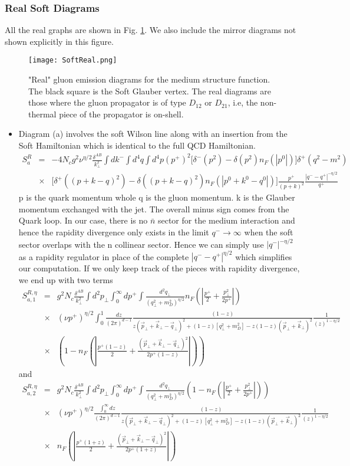 \documentclass[letter,11pt]{article}
\newcommand{\nn}{\nonumber}
\newcommand{\bea}{\begin{eqnarray}}
\newcommand{\eea}{\end{eqnarray}}
\def\nn{\nonumber}
\begin{document}
\subsubsection{Real Soft Diagrams}
 All the real graphs are shown in Fig. \ref{SoftR}. We also include the mirror diagrams not shown explicitly in this figure.
\begin{figure}
  \texttt{[image: SoftReal.png]}
  \caption{"Real" gluon emission diagrams for the medium structure function. The black square is the Soft Glauber vertex. The real diagrams are those where the gluon propagator is of type $D_{12}$ or $D_{21}$, i.e, the non-thermal piece of the propagator is on-shell. }
  \label{SoftR}
\end{figure}
\begin{itemize}
\item Diagram (a) involves the soft Wilson line along with an insertion from the Soft Hamiltonian which is identical to the full QCD Hamiltonian.
\bea
S_a^R&= & -4N_cg^2\nu^{\eta/2}\frac{\delta^{AB}}{k_{\perp}^2}\int dk^-\int d^4q\int d^4p(p^+)^2\Big[\delta^-(p^2)-\delta(p^2)n_F(|p^0|)\Big]\delta^+(q^2-m^2)\nn\\
&\times&\Big[\delta^+((p+k-q)^2)-\delta((p+k-q)^2)n_F(|p^0+k^0-q^0|)\Big]\frac{p^+}{(p+k)^2}\frac{|q^--q^+|^{-\eta/2}}{q^+}\nn
\eea
p is the quark momentum whole q is the gluon momentum. k is the Glauber momentum exchanged with the jet. The overall minus sign comes from the Quark loop. In our case, there is no $\bar n$ sector for the medium interaction and hence the rapidity divergence only exists in the limit $q^- \rightarrow \infty$ when the soft sector overlaps with the n collinear sector. Hence we can simply use $|q^-|^{-\eta/2}$ as a rapidity regulator in place of the complete $|q^--q^+|^{\eta/2}$ which simplifies our computation. If we only keep track of the pieces with rapidity divergence, we end up with two terms 
\bea 
 S_{a,1}^{R,\eta}&=&g^2N_c\frac{\delta^{AB}}{k_{\perp}^2}\int d^2p_{\perp}\int_0^{\infty}dp^+ \int \frac{d^2q_{\perp}}{(q_{\perp}^2+m_D^2)^{\eta/2}}n_F(|\frac{p^+}{2}+\frac{p_{\perp}^2}{2p^+}|)\nn\\
&\times& (\nu p^+)^{\eta/2}\int_0^{1}\frac{dz}{(2\pi)^{d-1}}\frac{(1-z)}{z(\vec{p}_{\perp}+\vec{k}_{\perp}-\vec{q}_{\perp})^2+(1-z)[q_{\perp}^2+m_D^2]-z(1-z)(\vec{p}_{\perp}+\vec{k}_{\perp})^2}\frac{1}{(z)^{1-\eta/2}}\nn\\
&\times&\left(1-n_F(|\frac{p^+(1-z)}{2}+\frac{(\vec{p}_{\perp}+\vec{k}_{\perp}-\vec{q}_{\perp})^2}{2p^+(1-z)}|)\right)
\eea
and 
\bea
 S_{a,2}^{R,\eta}&=&g^2N_c\frac{\delta^{AB}}{k_{\perp}^2}\int d^2p_{\perp}\int_{0}^{\infty} dp^+\int \frac{d^2q_{\perp}}{(q_{\perp}^2+m_D^2)^{\eta/2}}\left(1-n_F(|\frac{p^+}{2}+\frac{p_{\perp}^2}{2p^+}|)\right)\nn\\
&\times& (\nu p^+)^{\eta/2}\frac{\int_0^{\infty}dz}{(2\pi)^{d-1}}\frac{(1-z)}{z(\vec{p}_{\perp}+\vec{k}_{\perp}-\vec{q}_{\perp})^2+(1-z)[q_{\perp}^2+m_D^2]-z(1-z)(\vec{p}_{\perp}+\vec{k}_{\perp})^2}\frac{1}{(z)^{1-\eta/2}}\nn\\
&\times&n_F(|\frac{p^+(1+z)}{2}+\frac{(\vec{p}_{\perp}+\vec{k}_{\perp}-\vec{q}_{\perp})^2}{2p^+(1+z)}|)
\eea


\end{itemize}
\end{document}
